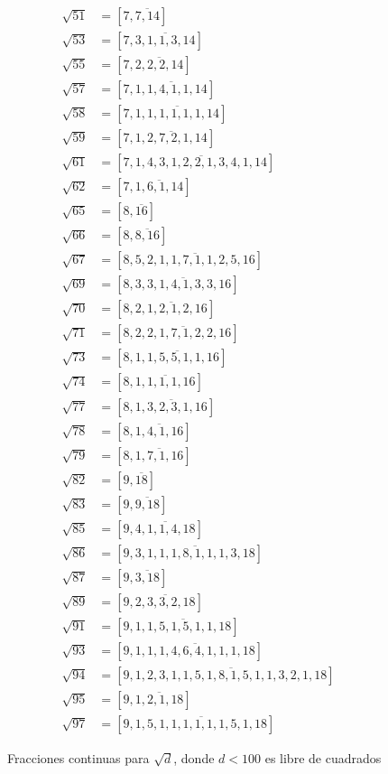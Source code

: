 \begin{figure}
\begin{multicols}{2}
    \begin{align*}
      \sqrt{51} & = [7,\overline{7,14}] \\
      \sqrt{53} & = [7,\overline{3,1,1,3,14}] \\
      \sqrt{55} & = [7,\overline{2,2,2,14}] \\
      \sqrt{57} & = [7,\overline{1,1,4,1,1,14}] \\
      \sqrt{58} & = [7,\overline{1,1,1,1,1,1,14}] \\
      \sqrt{59} & = [7,\overline{1,2,7,2,1,14}] \\
      \sqrt{61} & = [7,\overline{1,4,3,1,2,2,1,3,4,1,14}] \\
      \sqrt{62} & = [7,\overline{1,6,1,14}] \\
      \sqrt{65} & = [8,\overline{16}] \\
      \sqrt{66} & = [8,\overline{8,16}] \\
      \sqrt{67} & = [8,\overline{5,2,1,1,7,1,1,2,5,16}] \\
      \sqrt{69} & = [8,\overline{3,3,1,4,1,3,3,16}] \\
      \sqrt{70} & = [8,\overline{2,1,2,1,2,16}] \\
      \sqrt{71} & = [8,\overline{2,2,1,7,1,2,2,16}] \\
      \sqrt{73} & = [8,\overline{1,1,5,5,1,1,16}] \\
      \sqrt{74} & = [8,\overline{1,1,1,1,16}] \\
      \sqrt{77} & = [8,\overline{1,3,2,3,1,16}] \\
      \sqrt{78} & = [8,\overline{1,4,1,16}] \\
      \sqrt{79} & = [8,\overline{1,7,1,16}] \\
      \sqrt{82} & = [9,\overline{18}] \\
      \sqrt{83} & = [9,\overline{9,18}] \\
      \sqrt{85} & = [9,\overline{4,1,1,4,18}] \\
      \sqrt{86} & = [9,\overline{3,1,1,1,8,1,1,1,3,18}] \\
      \sqrt{87} & = [9,\overline{3,18}] \\
      \sqrt{89} & = [9,\overline{2,3,3,2,18}] \\
      \sqrt{91} & = [9,\overline{1,1,5,1,5,1,1,18}] \\
      \sqrt{93} & = [9,\overline{1,1,1,4,6,4,1,1,1,18}] \\
      \sqrt{94} & = [9,\overline{1,2,3,1,1,5,1,8,1,5,1,1,3,2,1,18}] \\
      \sqrt{95} & = [9,\overline{1,2,1,18}] \\
      \sqrt{97} & = [9,\overline{1,5,1,1,1,1,1,1,5,1,18}]
    \end{align*}
  \end{multicols}

  \caption{Fracciones continuas para $\sqrt{d}$, donde $d < 100$ es libre de cuadrados}
  \label{fig:fracciones-continuas-para-sqrt-d}
\end{figure}

